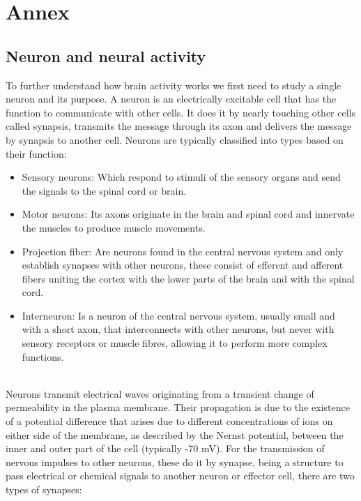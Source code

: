 \section{Annex}
\label{sec-annex}

\subsection{Neuron and neural activity}
\label{subsec-neuron}

To further understand how brain activity works we first need to study a single neuron and its purpose. A neuron is an electrically excitable cell that has the function to communicate with other cells. It does it by nearly touching other cells called synapsis, transmits the message through its axon and delivers the message by synapsis to another cell. Neurons are typically classified into types based on their function:
\\
\begin{itemize}
  \item Sensory neurons: Which respond to stimuli of the sensory organs and send the signals to the spinal cord or brain.
  \item Motor neurons: Its axons originate in the brain and spinal cord and innervate the muscles to produce muscle movements.
  \item Projection fiber: Are neurons found in the central nervous system and only establish synapses with other neurons, these consist of efferent and afferent fibers uniting the cortex with the lower parts of the brain and with the spinal cord.
  \item Interneuron: Is a neuron of the central nervous system, usually small and with a short axon, that interconnects with other neurons, but never with sensory receptors or muscle fibres, allowing it to perform more complex functions.
\end{itemize}
\leavevmode\\
Neurons transmit electrical waves originating from a transient change of permeability in the plasma membrane. Their propagation is due to the existence of a potential difference that arises due to different concentrations of ions on either side of the membrane, as described by the Nernst potential, between the inner and outer part of the cell (typically -70 mV). For the transmission of nervous impulses to other neurons, these do it by synapse, being a structure to pass electrical or chemical signals to another neuron or effector cell, there are two types of synapses:
\\
